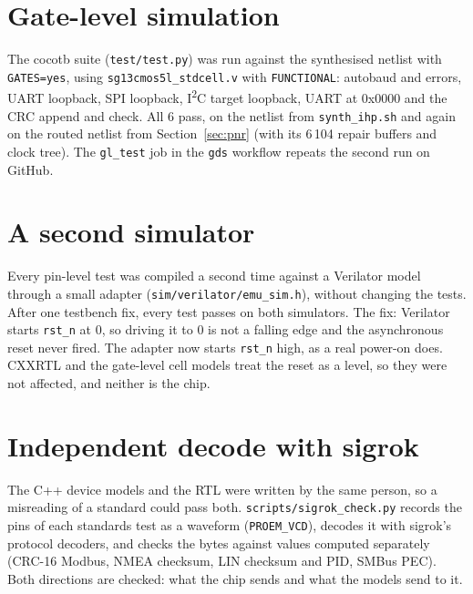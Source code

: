 \documentclass[11pt,a4paper]{article}
\newcommand{\sig}[1]{\texttt{#1}}
\begin{document}
\section{Gate-level simulation}

The cocotb suite (\sig{test/test.py}) was run against the synthesised netlist with \sig{GATES=yes}, using \sig{sg13cmos5l\_stdcell.v} with \sig{FUNCTIONAL}: autobaud and errors, UART loopback, SPI loopback, I\textsuperscript{2}C target loopback, UART at 0x0000 and the CRC append and check. All 6 pass, on the netlist from \sig{synth\_ihp.sh} and again on the routed netlist from Section~\ref{sec:pnr} (with its 6\,104 repair buffers and clock tree). The \sig{gl\_test} job in the \sig{gds} workflow repeats the second run on GitHub.

\section{A second simulator}

Every pin-level test was compiled a second time against a Verilator model through a small adapter (\sig{sim/verilator/emu\_sim.h}), without changing the tests. After one testbench fix, every test passes on both simulators. The fix: Verilator starts \sig{rst\_n} at 0, so driving it to 0 is not a falling edge and the asynchronous reset never fired. The adapter now starts \sig{rst\_n} high, as a real power-on does. CXXRTL and the gate-level cell models treat the reset as a level, so they were not affected, and neither is the chip.

\section{Independent decode with sigrok}

The C++ device models and the RTL were written by the same person, so a misreading of a standard could pass both. \sig{scripts/sigrok\_check.py} records the pins of each standards test as a waveform (\sig{PROEM\_VCD}), decodes it with sigrok's protocol decoders, and checks the bytes against values computed separately (CRC-16 Modbus, NMEA checksum, LIN checksum and PID, SMBus PEC). Both directions are checked: what the chip sends and what the models send to it.
\end{document}
